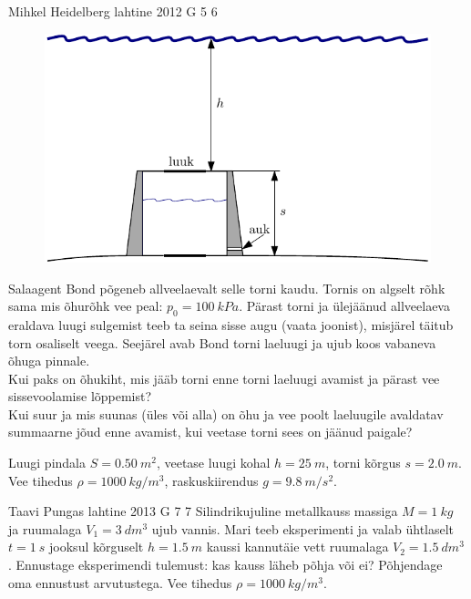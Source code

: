\documentclass[11pt]{article}
\begin{document}
{%
{Mihkel Heidelberg} %
{lahtine} %
{2012} %
{G 5} %
{6} %
{
\ifStatement
\begin{figure}%
\includegraphics[width=\linewidth]{2012-lahg-05-allveelaev_g}%
\end{figure}
Salaagent Bond põgeneb allveelaevalt selle torni kaudu. Tornis on algselt
rõhk sama mis õhurõhk vee peal: $p_0 = \SI{100}{kPa}$. Pärast torni ja ülejäänud
allveelaeva eraldava luugi sulgemist teeb ta seina sisse augu (vaata joonist), misjärel
täitub torn osaliselt veega. Seejärel avab Bond torni laeluugi ja ujub
koos vabaneva õhuga pinnale.\\
\osa Kui paks on õhukiht, mis jääb torni enne torni
laeluugi avamist ja pärast vee sissevoolamise lõppemist?\\
\osa Kui suur ja mis suunas (üles või alla) on õhu ja vee poolt laeluugile avaldatav summaarne jõud enne
avamist, kui veetase torni sees on jäänud paigale?
\par
Luugi pindala $S =
\SI{0,50}{m^2}$, veetase luugi kohal $h=\SI{25}{m}$, torni kõrgus 
$s=\SI{2,0}{m}$. Vee tihedus $\rho = \SI{1000}{kg/m^3}$, raskuskiirendus $g =
\SI{9,8}{m/s^2}$.
\fi
}

{Taavi Pungas} %
{lahtine} %
{2013} %
{G 7} %
{7} %
{
\ifStatement
Silindrikujuline metallkauss massiga $M=\SI{1}{kg}$ ja ruumalaga
$V_1=\SI{3}{dm^3}$ ujub vannis. Mari teeb eksperimenti ja valab ühtlaselt
$t=\SI{1}{s}$ jooksul kõrguselt $h=\SI{1,5}{m}$ kaussi kannutäie vett ruumalaga
$V_2=\SI{1,5}{dm^3}$. Ennustage eksperimendi tulemust: kas kauss läheb põhja või
ei? Põhjendage oma ennustust arvutustega. Vee tihedus $\rho=\SI{1000}{kg/m^3}$.
\fi
}

}
\end{document}
